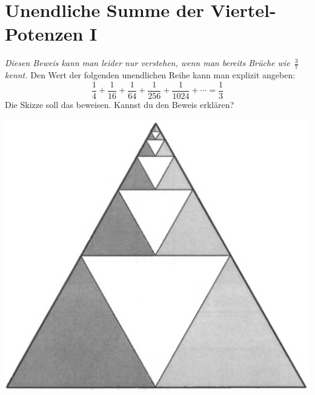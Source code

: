 \documentclass{../zirkelblatt}
\begin{document}
\vfill
\section*{Unendliche Summe der Viertel-Potenzen I}
\emph{Diesen Beweis kann man leider nur verstehen, wenn man bereits Brüche
wie~$\frac{3}{7}$ kennt.}
Den Wert der folgenden unendlichen Reihe kann man
explizit angeben:
\[ \frac{1}{4} + \frac{1}{16} + \frac{1}{64} +
\frac{1}{256} + \frac{1}{1024} + \cdots = \frac{1}{3} \]
Die Skizze soll das beweisen. Kannst du den Beweis erklären?
\begin{center}
\includegraphics[scale=0.3]{geometrische-reihe-1}
\end{center}


\vfill
\end{document}
